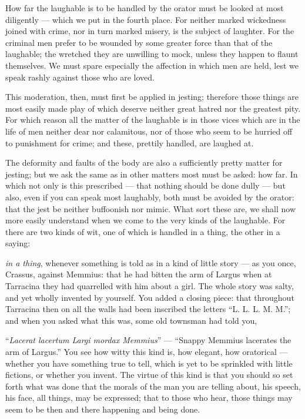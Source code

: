  How far the laughable is to be handled by the orator must be looked at most diligently — which we put in the fourth place. For neither marked wickedness joined with crime, nor in turn marked misery, is the subject of laughter. For the criminal men prefer to be wounded by some greater force than that of the laughable; the wretched they are unwilling to mock, unless they happen to flaunt themselves. We must spare especially the affection in which men are held, lest we speak rashly against those who are loved.

 This moderation, then, must first be applied in jesting; therefore those things are most easily made play of which deserve neither great hatred nor the greatest pity. For which reason all the matter of the laughable is in those vices which are in the life of men neither dear nor calamitous, nor of those who seem to be hurried off to punishment for crime; and these, prettily handled, are laughed at.

 The deformity and faults of the body are also a sufficiently pretty matter for jesting; but we ask the same as in other matters most must be asked: how far. In which not only is this prescribed — that nothing should be done dully — but also, even if you can speak most laughably, both must be avoided by the orator: that the jest be neither buffoonish nor mimic. What sort these are, we shall now more easily understand when we come to the very kinds of the laughable. For there are two kinds of wit, one of which is handled in a thing, the other in a saying:

 \textit{in a thing}, whenever something is told as in a kind of little story — as you once, Crassus, against Memmius: that he had bitten the arm of Largus when at Tarracina they had quarrelled with him about a girl. The whole story was salty, and yet wholly invented by yourself. You added a closing piece: that throughout Tarracina then on all the walls had been inscribed the letters ``L. L. L. M. M.''; and when you asked what this was, some old townsman had told you,

 ``\textit{Lacerat lacertum Largi mordax Memmius}'' — ``Snappy Memmius lacerates the arm of Largus.'' You see how witty this kind is, how elegant, how oratorical — whether you have something true to tell, which is yet to be sprinkled with little fictions, or whether you invent. The virtue of this kind is that you should so set forth what was done that the morals of the man you are telling about, his speech, his face, all things, may be expressed; that to those who hear, those things may seem to be then and there happening and being done.

